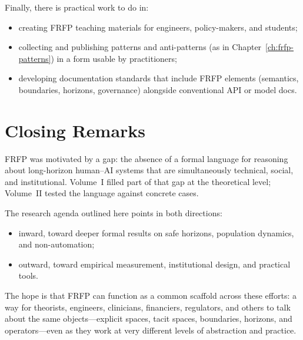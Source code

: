 Finally, there is practical work to do in:

\begin{itemize}
  \item creating FRFP teaching materials for engineers, policy-makers,
        and students;
  \item collecting and publishing patterns and anti-patterns (as in
        Chapter~\ref{ch:frfp-patterns}) in a form usable by
        practitioners;
  \item developing documentation standards that include FRFP elements
        (semantics, boundaries, horizons, governance) alongside
        conventional API or model docs.
\end{itemize}

\section{Closing Remarks}

FRFP was motivated by a gap:
the absence of a formal language for reasoning about long-horizon
human--AI systems that are simultaneously technical, social, and
institutional.
Volume~I filled part of that gap at the theoretical level;
Volume~II tested the language against concrete cases.

The research agenda outlined here points in both directions:

\begin{itemize}
  \item inward, toward deeper formal results on safe horizons,
        population dynamics, and non-automation;
  \item outward, toward empirical measurement, institutional design,
        and practical tools.
\end{itemize}

The hope is that FRFP can function as a common scaffold across these
efforts: a way for theorists, engineers, clinicians, financiers,
regulators, and others to talk about the same objects---explicit
spaces, tacit spaces, boundaries, horizons, and operators---even as
they work at very different levels of abstraction and practice.
